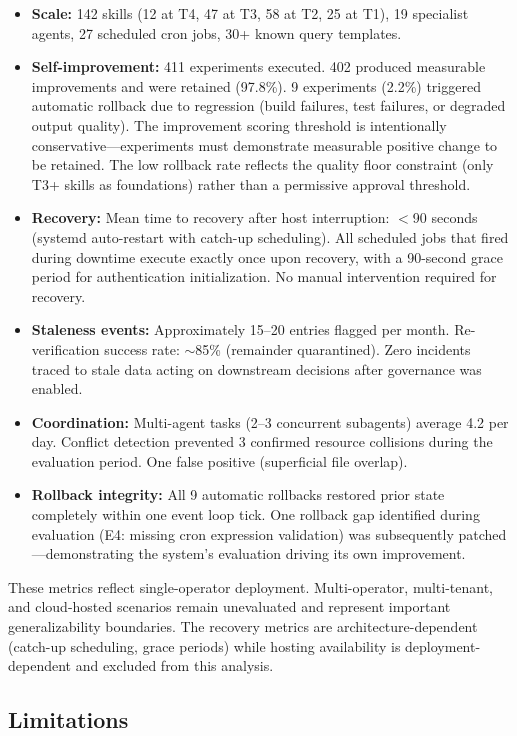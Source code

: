 \documentclass[11pt]{article}
\begin{document}
\begin{itemize}[nosep]
\item \textbf{Scale:} 142 skills (12 at T4, 47 at T3, 58 at T2, 25 at T1), 19 specialist agents, 27 scheduled cron jobs, 30+ known query templates.
\item \textbf{Self-improvement:} 411 experiments executed. 402 produced measurable improvements and were retained (97.8\%). 9 experiments (2.2\%) triggered automatic rollback due to regression (build failures, test failures, or degraded output quality). The improvement scoring threshold is intentionally conservative---experiments must demonstrate measurable positive change to be retained. The low rollback rate reflects the quality floor constraint (only T3+ skills as foundations) rather than a permissive approval threshold.
\item \textbf{Recovery:} Mean time to recovery after host interruption: $<$90 seconds (systemd auto-restart with catch-up scheduling). All scheduled jobs that fired during downtime execute exactly once upon recovery, with a 90-second grace period for authentication initialization. No manual intervention required for recovery.
\item \textbf{Staleness events:} Approximately 15--20 entries flagged per month. Re-verification success rate: $\sim$85\% (remainder quarantined). Zero incidents traced to stale data acting on downstream decisions after governance was enabled.
\item \textbf{Coordination:} Multi-agent tasks (2--3 concurrent subagents) average 4.2 per day. Conflict detection prevented 3 confirmed resource collisions during the evaluation period. One false positive (superficial file overlap).
\item \textbf{Rollback integrity:} All 9 automatic rollbacks restored prior state completely within one event loop tick. One rollback gap identified during evaluation (E4: missing cron expression validation) was subsequently patched---demonstrating the system's evaluation driving its own improvement.
\end{itemize}

These metrics reflect single-operator deployment. Multi-operator, multi-tenant, and cloud-hosted scenarios remain unevaluated and represent important generalizability boundaries. The recovery metrics are architecture-dependent (catch-up scheduling, grace periods) while hosting availability is deployment-dependent and excluded from this analysis.

\subsection{Limitations}
\end{document}
